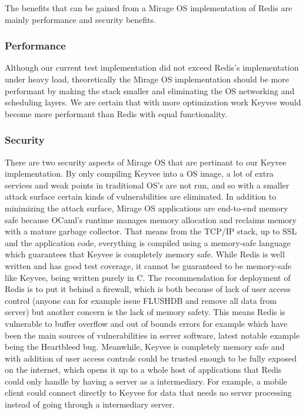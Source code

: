 \documentclass[english,10pt,twocolumn]{article}
\begin{document}
The benefits that can be gained from a Mirage OS implementation of Redis are mainly performance and security benefits.

\subsubsection{Performance}

Although our current test implementation did not exceed Redis's implementation under heavy load, theoretically the Mirage OS implementation should be more performant by making the stack smaller and eliminating the OS networking and scheduling layers. We are certain that with more optimization work Keyvee would become more performant than Redis with equal functionality.

\subsubsection{Security}

There are two security aspects of Mirage OS that are pertinant to our Keyvee implementation.
By only compiling Keyvee into a OS image, a lot of extra services and weak points in traditional OS's are not run, and so with a smaller attack surface certain kinds of vulnerabilities are eliminated.
In addition to minimizing the attack surface, Mirage OS applications are end-to-end memory safe because OCaml's runtime manages memory allocation and reclaims memory with a mature garbage collector.
That means from the TCP/IP stack, up to SSL and the application code, everything is compiled using a memory-safe language which guarantees that Keyvee is completely memory safe.
While Redis is well written and has good test coverage, it cannot be guaranteed to be memory-safe like Keyvee, being written purely in C.
The recommendation for deployment of Redis is to put it behind a firewall, which is both because of lack of user access control (anyone can for example issue FLUSHDB and remove all data from server) but another concern is the lack of memory safety.
This means Redis is vulnerable to buffer overflow and out of bounds errors for example which have been the main sources of vulnerabilities in server software, latest notable example being the Heartbleed bug.
Meanwhile, Keyvee is completely memory safe and with addition of user access controls could be trusted enough to be fully exposed on the internet, which opens it up to a whole host of applications that Redis could only handle by having a server as a intermediary.
For example, a mobile client could connect directly to Keyvee for data that needs no server processing instead of going through a intermediary server.
\end{document}
